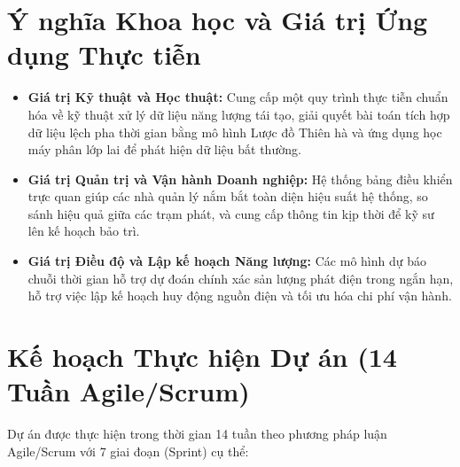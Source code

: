 \documentclass[12pt, a4paper]{report}
\begin{document}
\section{Ý nghĩa Khoa học và Giá trị Ứng dụng Thực tiễn}
\label{sec:ynghia}

\begin{itemize}[noitemsep]
    \item \textbf{Giá trị Kỹ thuật và Học thuật:} Cung cấp một quy trình thực tiễn chuẩn hóa về kỹ thuật xử lý dữ liệu năng lượng tái tạo, giải quyết bài toán tích hợp dữ liệu lệch pha thời gian bằng mô hình Lược đồ Thiên hà và ứng dụng học máy phân lớp lai để phát hiện dữ liệu bất thường.
    \item \textbf{Giá trị Quản trị và Vận hành Doanh nghiệp:} Hệ thống bảng điều khiển trực quan giúp các nhà quản lý nắm bắt toàn diện hiệu suất hệ thống, so sánh hiệu quả giữa các trạm phát, và cung cấp thông tin kịp thời để kỹ sư lên kế hoạch bảo trì.
    \item \textbf{Giá trị Điều độ và Lập kế hoạch Năng lượng:} Các mô hình dự báo chuỗi thời gian hỗ trợ dự đoán chính xác sản lượng phát điện trong ngắn hạn, hỗ trợ việc lập kế hoạch huy động nguồn điện và tối ưu hóa chi phí vận hành.
\end{itemize}

\newpage
\section{Kế hoạch Thực hiện Dự án (14 Tuần Agile/Scrum)}
\label{sec:kehoach}

Dự án được thực hiện trong thời gian 14 tuần theo phương pháp luận Agile/Scrum với 7 giai đoạn (Sprint) cụ thể:
\end{document}
